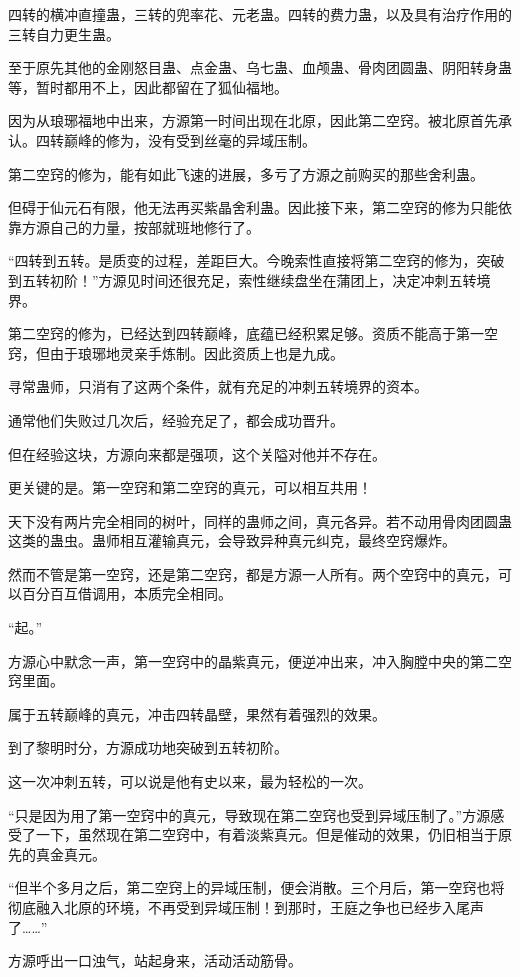 \begin{this_body}
四转的横冲直撞蛊，三转的兜率花、元老蛊。四转的费力蛊，以及具有治疗作用的三转自力更生蛊。

至于原先其他的金刚怒目蛊、点金蛊、乌七蛊、血颅蛊、骨肉团圆蛊、阴阳转身蛊等，暂时都用不上，因此都留在了狐仙福地。

因为从琅琊福地中出来，方源第一时间出现在北原，因此第二空窍。被北原首先承认。四转巅峰的修为，没有受到丝毫的异域压制。

第二空窍的修为，能有如此飞速的进展，多亏了方源之前购买的那些舍利蛊。

但碍于仙元石有限，他无法再买紫晶舍利蛊。因此接下来，第二空窍的修为只能依靠方源自己的力量，按部就班地修行了。

“四转到五转。是质变的过程，差距巨大。今晚索性直接将第二空窍的修为，突破到五转初阶！”方源见时间还很充足，索性继续盘坐在蒲团上，决定冲刺五转境界。

第二空窍的修为，已经达到四转巅峰，底蕴已经积累足够。资质不能高于第一空窍，但由于琅琊地灵亲手炼制。因此资质上也是九成。

寻常蛊师，只消有了这两个条件，就有充足的冲刺五转境界的资本。

通常他们失败过几次后，经验充足了，都会成功晋升。

但在经验这块，方源向来都是强项，这个关隘对他并不存在。

更关键的是。第一空窍和第二空窍的真元，可以相互共用！

天下没有两片完全相同的树叶，同样的蛊师之间，真元各异。若不动用骨肉团圆蛊这类的蛊虫。蛊师相互灌输真元，会导致异种真元纠克，最终空窍爆炸。

然而不管是第一空窍，还是第二空窍，都是方源一人所有。两个空窍中的真元，可以百分百互借调用，本质完全相同。

“起。”

方源心中默念一声，第一空窍中的晶紫真元，便逆冲出来，冲入胸膛中央的第二空窍里面。

属于五转巅峰的真元，冲击四转晶壁，果然有着强烈的效果。

到了黎明时分，方源成功地突破到五转初阶。

这一次冲刺五转，可以说是他有史以来，最为轻松的一次。

“只是因为用了第一空窍中的真元，导致现在第二空窍也受到异域压制了。”方源感受了一下，虽然现在第二空窍中，有着淡紫真元。但是催动的效果，仍旧相当于原先的真金真元。

“但半个多月之后，第二空窍上的异域压制，便会消散。三个月后，第一空窍也将彻底融入北原的环境，不再受到异域压制！到那时，王庭之争也已经步入尾声了……”

方源呼出一口浊气，站起身来，活动活动筋骨。


\end{this_body}
